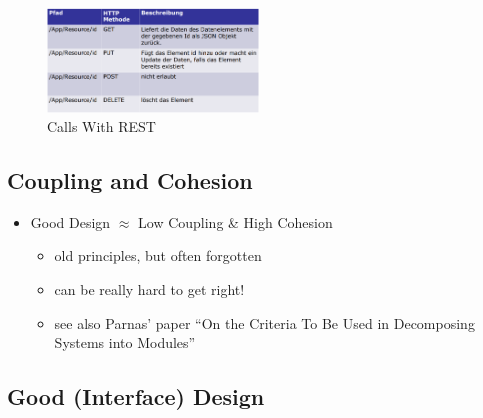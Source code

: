 \begin{figure}[H]
\centering
\includegraphics[width=0.5\textwidth]{figures/RestCAlls.PNG}
\caption{Calls With REST}
\end{figure}

\hypertarget{coupling-and-cohesion}{%
\subsection{Coupling and Cohesion}\label{coupling-and-cohesion}}

\begin{itemize}
\tightlist
\item
  Good Design $ \approx $ Low Coupling \& High Cohesion

  \begin{itemize}
  \tightlist
  \item
    old principles, but often forgotten
  \item
    can be really hard to get right!
  \item
    see also Parnas' paper ``On the Criteria To Be Used in Decomposing
    Systems into Modules''
  \end{itemize}
\end{itemize}


\hypertarget{good-interface-design}{%
\subsection{Good (Interface) Design}\label{good-interface-design}}




